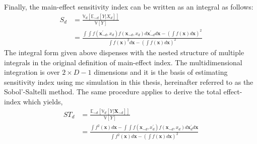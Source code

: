 Finally, the main-effect sensitivity index can be written as an integral as follows:
\begin{equation}
  \begin{split}
    S_d & = \frac{\mathbb{V}_d [\mathbb{E}_{\sim d} [Y|X_d]]}{\mathbb{V}[Y]} \\
        & = \frac{\int \int f(\mathbf{x}^{\prime}_{\sim d}, x_d) f(\mathbf{x}_{\sim d}, x_d) d\mathbf{x}^{\prime}_{\sim d} d\mathbf{x} - \left(\int f(\mathbf{x}) d\mathbf{x}\right)^2}{\int f(\mathbf{x})^2 d\mathbf{x} - \left( \int f(\mathbf{x}) d\mathbf{x}\right)^2}
  \end{split}
\label{eq:ss_main_effect_integral}
\end{equation}
The integral form given above dispenses with the nested structure of multiple integrals in the original definition of main-effect index.
The multidimensional integration is over $2 \times D - 1$ dimensions 
and it is the basis of estimating sensitivity index using \gls{mc} simulation in this thesis, hereinafter referred to as the Sobol'-Saltelli method.
The same procedure applies to derive the total effect-index which yields,
\begin{equation}
  \begin{split}
    ST_d & = \frac{\mathbb{E}_{\sim d}[\mathbb{V}_{d}[Y|\mathbf{X}_{\sim d}]]}{\mathbb{V}[Y]} \\
        & = \frac{\int f^2(\mathbf{x}) d\mathbf{x} - \int \int f(\mathbf{x}_{\sim d}, x^{\prime}_d) f(\mathbf{x}_{\sim d}, x_d) d\mathbf{x}^{\prime}_{d} d\mathbf{x}}{\int f^2(\mathbf{x}) d\mathbf{x} - \left( \int f(\mathbf{x}) d\mathbf{x}\right)^2}
  \end{split}
\label{eq:ss_total_effect_integral}
\end{equation}